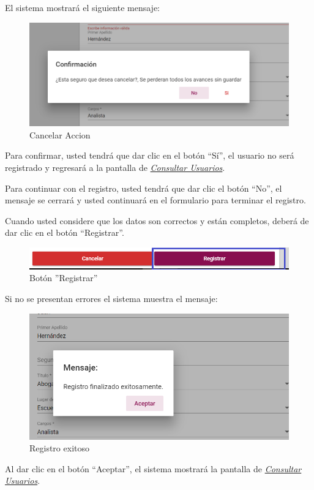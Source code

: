 El sistema mostrará el siguiente mensaje:


\begin{figure}[H]
	\centering
	\includegraphics[width=0.4\linewidth]{images/SP5/MSG29}
	\caption{Cancelar Accion}
	\label{mensaje29}
\end{figure}

Para confirmar, usted tendrá que dar clic en el botón “Sí”, el usuario no será registrado y regresará a la pantalla de \hyperlink{consultarUs}{\textit{Consultar Usuarios}}.

Para continuar con el registro, usted tendrá que  dar clic el botón “No”, el mensaje se  cerrará y usted continuará en el formulario para terminar el registro.

Cuando usted considere que los datos son correctos y están completos, deberá de dar clic en el botón “Registrar”.

\begin{figure}[H]
	\centering
	\hypertarget{btnreg}{\includegraphics[width=0.7\linewidth]{images/SP5/BtnRegistrar}}
	\caption{Botón ''Registrar''}
	\label{btnreg}
\end{figure}

Si no se presentan errores el sistema muestra el mensaje:


\begin{figure}[H]
	\centering
	\includegraphics[width=0.4\linewidth]{images/SP5/MSG5}
	\caption{Registro exitoso}
	\label{mensaje5}

\end{figure}

Al dar clic en el botón “Aceptar”, el sistema mostrará la pantalla de  \hyperlink{consultarUs}{\textit{Consultar Usuarios}}.

